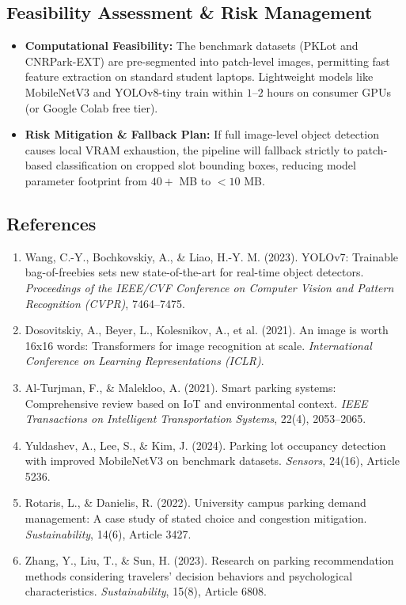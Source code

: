 \documentclass[11pt,a4paper]{article}
\begin{document}
\subsection{Feasibility Assessment \& Risk Management}
\begin{itemize}[leftmargin=1.5em]
    \item \textbf{Computational Feasibility:} The benchmark datasets (PKLot and CNRPark-EXT) are pre-segmented into patch-level images, permitting fast feature extraction on standard student laptops. Lightweight models like MobileNetV3 and YOLOv8-tiny train within $1$--$2$ hours on consumer GPUs (or Google Colab free tier).
    \item \textbf{Risk Mitigation \& Fallback Plan:} If full image-level object detection causes local VRAM exhaustion, the pipeline will fallback strictly to patch-based classification on cropped slot bounding boxes, reducing model parameter footprint from $40+$ MB to $< 10$ MB.
\end{itemize}

\subsection{References}
\begin{enumerate}[leftmargin=1.5em]
    \item Wang, C.-Y., Bochkovskiy, A., \& Liao, H.-Y. M. (2023). YOLOv7: Trainable bag-of-freebies sets new state-of-the-art for real-time object detectors. \textit{Proceedings of the IEEE/CVF Conference on Computer Vision and Pattern Recognition (CVPR)}, 7464--7475.
    \item Dosovitskiy, A., Beyer, L., Kolesnikov, A., et al. (2021). An image is worth 16x16 words: Transformers for image recognition at scale. \textit{International Conference on Learning Representations (ICLR)}.
    \item Al-Turjman, F., \& Malekloo, A. (2021). Smart parking systems: Comprehensive review based on IoT and environmental context. \textit{IEEE Transactions on Intelligent Transportation Systems}, 22(4), 2053--2065.
    \item Yuldashev, A., Lee, S., \& Kim, J. (2024). Parking lot occupancy detection with improved MobileNetV3 on benchmark datasets. \textit{Sensors}, 24(16), Article 5236.
    \item Rotaris, L., \& Danielis, R. (2022). University campus parking demand management: A case study of stated choice and congestion mitigation. \textit{Sustainability}, 14(6), Article 3427.
    \item Zhang, Y., Liu, T., \& Sun, H. (2023). Research on parking recommendation methods considering travelers' decision behaviors and psychological characteristics. \textit{Sustainability}, 15(8), Article 6808.
\end{enumerate}
\end{document}
